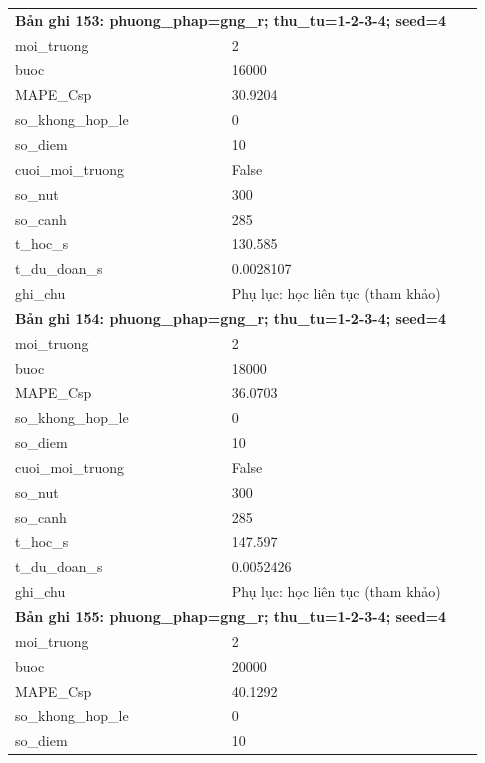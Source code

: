 \begin{longtable}{p{0.43\linewidth}p{0.50\linewidth}}
\midrule
\multicolumn{2}{p{0.95\linewidth}}{\textbf{Bản ghi 153: phuong\_phap=gng\_r; thu\_tu=1-2-3-4; seed=4}} \\
moi\_\allowbreak truong & 2 \\
buoc & 16000 \\
MAPE\_\allowbreak Csp & 30.9204 \\
so\_\allowbreak khong\_\allowbreak hop\_\allowbreak le & 0 \\
so\_\allowbreak diem & 10 \\
cuoi\_\allowbreak moi\_\allowbreak truong & False \\
so\_\allowbreak nut & 300 \\
so\_\allowbreak canh & 285 \\
t\_\allowbreak hoc\_\allowbreak s & 130.585 \\
t\_\allowbreak du\_\allowbreak doan\_\allowbreak s & 0.0028107 \\
ghi\_\allowbreak chu & Phụ lục: học liên tục (tham khảo) \\
\midrule
\multicolumn{2}{p{0.95\linewidth}}{\textbf{Bản ghi 154: phuong\_phap=gng\_r; thu\_tu=1-2-3-4; seed=4}} \\
moi\_\allowbreak truong & 2 \\
buoc & 18000 \\
MAPE\_\allowbreak Csp & 36.0703 \\
so\_\allowbreak khong\_\allowbreak hop\_\allowbreak le & 0 \\
so\_\allowbreak diem & 10 \\
cuoi\_\allowbreak moi\_\allowbreak truong & False \\
so\_\allowbreak nut & 300 \\
so\_\allowbreak canh & 285 \\
t\_\allowbreak hoc\_\allowbreak s & 147.597 \\
t\_\allowbreak du\_\allowbreak doan\_\allowbreak s & 0.0052426 \\
ghi\_\allowbreak chu & Phụ lục: học liên tục (tham khảo) \\
\midrule
\multicolumn{2}{p{0.95\linewidth}}{\textbf{Bản ghi 155: phuong\_phap=gng\_r; thu\_tu=1-2-3-4; seed=4}} \\
moi\_\allowbreak truong & 2 \\
buoc & 20000 \\
MAPE\_\allowbreak Csp & 40.1292 \\
so\_\allowbreak khong\_\allowbreak hop\_\allowbreak le & 0 \\
so\_\allowbreak diem & 10 \\

\end{longtable}
